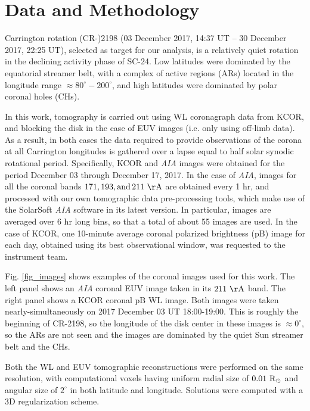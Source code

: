 \documentclass[baaa]{baaa}
\begin{document}
\section{Data and Methodology}\label{method}

Carrington rotation (CR-)2198 {(03 December 2017, 14:37 UT -- 30 December 2017, 22:25 UT)}, selected as target for our analysis, is a relatively quiet rotation in the declining activity phase of SC-24. Low latitudes were dominated by the equatorial streamer belt, with a complex of active regions (ARs) located in the longitude range $\approx 80^\circ-200^\circ$, and high latitudes were dominated by polar coronal holes (CHs).  

In this work, tomography is carried out using WL coronagraph data from KCOR, and blocking the disk in the case of EUV images (i.e. only using off-limb data). As a result, in both cases the data  required to provide observations of the corona at all Carrington longitudes is gathered over a lapse equal to half solar synodic rotational period. Specifically,  KCOR and \textsl{AIA} images were obtained for the period December 03 through December 17, 2017. In the case of \textsl{AIA}, images for all the coronal bands $171, 193, \rm{and}\, 211~\AA$ are obtained every 1 hr, and processed with our own tomographic data pre-processing tools, which make use of the SolarSoft \textsl{AIA} software in its latest version. In particular, images are averaged over 6 hr long bins, so that a total of about 55 images are used. In the case of KCOR, one 10-minute average coronal polarized brightness (pB) image for each day, obtained using its best observational window, was requested to the instrument team.

Fig. \ref{fig_images} shows examples of the coronal images used for this work. The left panel shows an \textsl{AIA} coronal EUV image taken in its $211~\rm{\AA}$ band. The right panel shows a KCOR coronal pB WL image. Both images were taken nearly-simultaneously on 2017 December 03 UT 18:00-19:00. This is roughly the beginning of CR-2198, so the longitude of the disk center in these images is $\approx 0^\circ$, so the ARs are not seen and the images are dominated by the quiet {Sun} streamer belt and the CHs.

Both the WL and EUV tomographic reconstructions were performed on the same resolution, with computational voxels having uniform radial size of $0.01~\rm{R}_\odot$ and angular size of $2^\circ$ in both latitude and longitude. Solutions were computed with a 3D regularization scheme.
\end{document}
